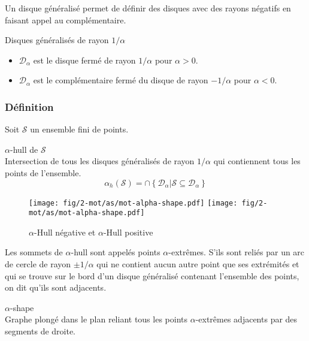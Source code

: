 Un disque généralisé permet de définir des disques avec des rayons négatifs en faisant appel au complémentaire.

\begin{Definition}{Disques généralisés de rayon $1/\alpha$}
\label{def:dis-gen}
\begin{itemize}
  \item $\mathcal{D}_{\alpha}$ est le disque fermé de rayon $1/\alpha$ pour $\alpha > 0$.
  \item $\mathcal{D}_{\alpha}$ est le complémentaire fermé du disque de rayon $- 1/\alpha$ pour $\alpha < 0$. 
\end{itemize}
\end{Definition}

\subsubsection{Définition}

Soit $\mathcal{S}$ un ensemble fini de points. 

\begin{Definition}{$\alpha$-hull de $\mathcal{S}$}\\
\label{def:ah-txt}
    Intersection de tous les disques généralisés de rayon $1/\alpha$ qui contiennent tous les points de l'ensemble.
    $$ \alpha_h(\mathcal{S}) = \cap \left\{ \mathcal{D}_{\alpha} | \mathcal{S} \subseteq \mathcal{D}_{\alpha} \right\}$$
\end{Definition}

\begin{figure}[H]
  \centering
  \texttt{[image: fig/2-mot/as/mot-alpha-shape.pdf]}
  \texttt{[image: fig/2-mot/as/mot-alpha-shape.pdf]}
  \caption{$\alpha$-Hull négative et $\alpha$-Hull positive }
\end{figure}
  
Les sommets de $\alpha$-hull sont appelés points $\alpha$-extrêmes. S'ils sont reliés par un arc de cercle de rayon $\pm 1/ \alpha$ qui ne contient aucun autre point que ses extrémités et qui se trouve sur le bord d'un disque généralisé contenant l'ensemble des points, on dit qu'ils sont adjacents.

\begin{Definition}{$\alpha$-shape}\\
\label{def:as}
      Graphe plongé dans le plan reliant tous les points $\alpha$-extrêmes adjacents par des segments de droite.
\end{Definition}

